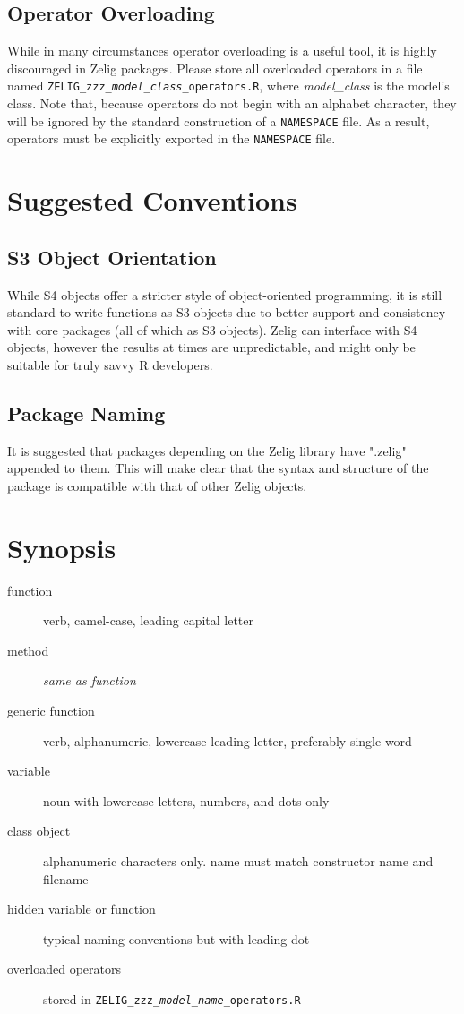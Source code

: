 \subsection{Operator Overloading}
While in many circumstances operator overloading is a useful tool, it is highly discouraged in Zelig packages.  Please store all overloaded operators in a file named {\tt ZELIG\_zzz\_\emph{model\_class}\_operators.R}, where \emph{model\_class} is the model's class.  Note that, because operators do not begin with an alphabet character, they will be ignored by the standard construction of a {\tt NAMESPACE} file.  As a result, operators must be explicitly exported in the {\tt NAMESPACE} file.



\section{Suggested Conventions}


\subsection{S3 Object Orientation}
While S4 objects offer a stricter style of object-oriented programming, it is still standard to write functions as S3 objects due to better support and consistency with core packages (all of which as S3 objects).  Zelig can interface with S4 objects, however the results at times are unpredictable, and might only be suitable for truly savvy R developers.



\subsection{Package Naming}
It is suggested that packages depending on the Zelig library have ".zelig" appended to them.  This will make clear that the syntax and structure of the package is compatible with that of other Zelig objects.


\section{Synopsis}

\begin{description}
	\item[function]{verb, camel-case, leading capital letter}
	\item[method]{\emph{same as function}}
	\item[generic function]{verb, alphanumeric, lowercase leading letter, preferably single word}
	\item[variable]{noun with lowercase letters, numbers, and dots only}
	\item[class object]{alphanumeric characters only.  name must match constructor name and filename}
	\item[hidden variable or function]{typical naming conventions but with leading dot}
	\item[overloaded operators]{stored in {\tt ZELIG\_zzz\_\emph{model\_name}\_operators.R}}
\end{description}